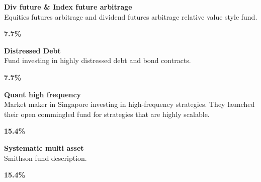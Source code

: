 \documentclass[11pt]{article}
\begin{document}
\begin{tcolorbox}[colback=cardbg, colframe=cardborder, boxrule=0.5pt, arc=4pt, left=6pt, right=6pt, top=6pt, bottom=6pt]
    \begin{minipage}[c]{0.82\linewidth}
        \textbf{\textcolor{primary}{Div future \& Index future arbitrage}} \\[4pt]
        \textcolor{primary}{Equities futures arbitrage and dividend futures arbitrage relative value style fund.}
    \end{minipage}%
    \hfill
    \begin{minipage}[c]{0.15\linewidth}
        \centering
        \textbf{\Large \textcolor{accent}{7.7\%}}
    \end{minipage}
\end{tcolorbox}

\begin{tcolorbox}[colback=cardbg, colframe=cardborder, boxrule=0.5pt, arc=4pt, left=6pt, right=6pt, top=6pt, bottom=6pt]
    \begin{minipage}[c]{0.82\linewidth}
        \textbf{\textcolor{primary}{Distressed Debt}} \\[4pt]
        \textcolor{primary}{Fund investing in highly distressed debt and bond contracts.}
    \end{minipage}%
    \hfill
    \begin{minipage}[c]{0.15\linewidth}
        \centering
        \textbf{\Large \textcolor{accent}{7.7\%}}
    \end{minipage}
\end{tcolorbox}

\begin{tcolorbox}[colback=cardbg, colframe=cardborder, boxrule=0.5pt, arc=4pt, left=6pt, right=6pt, top=6pt, bottom=6pt]
    \begin{minipage}[c]{0.82\linewidth}
        \textbf{\textcolor{primary}{Quant high frequency}} \\[4pt]
        \textcolor{primary}{Market maker in Singapore investing in high-frequency strategies. They launched their open commingled fund for strategies that are highly scalable.}
    \end{minipage}%
    \hfill
    \begin{minipage}[c]{0.15\linewidth}
        \centering
        \textbf{\Large \textcolor{accent}{15.4\%}}
    \end{minipage}
\end{tcolorbox}

\begin{tcolorbox}[colback=cardbg, colframe=cardborder, boxrule=0.5pt, arc=4pt, left=6pt, right=6pt, top=6pt, bottom=6pt]
    \begin{minipage}[c]{0.82\linewidth}
        \textbf{\textcolor{primary}{Systematic multi asset}} \\[4pt]
        \textcolor{primary}{Smithson fund description.}
    \end{minipage}%
    \hfill
    \begin{minipage}[c]{0.15\linewidth}
        \centering
        \textbf{\Large \textcolor{accent}{15.4\%}}
    \end{minipage}
\end{tcolorbox}
\end{document}
